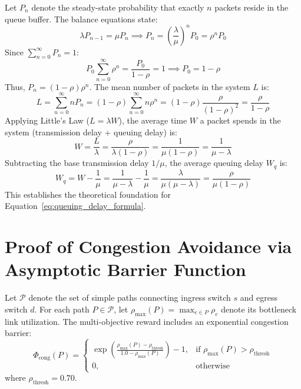 Let $P_n$ denote the steady-state probability that exactly $n$ packets reside in the queue buffer. The balance equations state:
\begin{equation}
    \lambda P_{n-1} = \mu P_n \implies P_n = \left(\frac{\lambda}{\mu}\right)^n P_0 = \rho^n P_0
\end{equation}
Since $\sum_{n=0}^\infty P_n = 1$:
\begin{equation}
    P_0 \sum_{n=0}^\infty \rho^n = \frac{P_0}{1 - \rho} = 1 \implies P_0 = 1 - \rho
\end{equation}
Thus, $P_n = (1 - \rho)\rho^n$. The mean number of packets in the system $L$ is:
\begin{equation}
    L = \sum_{n=0}^\infty n P_n = (1 - \rho) \sum_{n=0}^\infty n \rho^n = (1 - \rho) \frac{\rho}{(1 - \rho)^2} = \frac{\rho}{1 - \rho}
\end{equation}
Applying Little's Law ($L = \lambda W$), the average time $W$ a packet spends in the system (transmission delay + queuing delay) is:
\begin{equation}
    W = \frac{L}{\lambda} = \frac{\rho}{\lambda(1 - \rho)} = \frac{1}{\mu(1 - \rho)} = \frac{1}{\mu - \lambda}
\end{equation}
Subtracting the base transmission delay $1/\mu$, the average queuing delay $W_q$ is:
\begin{equation}
    W_q = W - \frac{1}{\mu} = \frac{1}{\mu - \lambda} - \frac{1}{\mu} = \frac{\lambda}{\mu(\mu - \lambda)} = \frac{\rho}{\mu(1 - \rho)}
\end{equation}
This establishes the theoretical foundation for Equation~\ref{eq:queuing_delay_formula}.

\section{Proof of Congestion Avoidance via Asymptotic Barrier Function}
\label{sec:proof_barrier}
Let $\mathcal{P}$ denote the set of simple paths connecting ingress switch $s$ and egress switch $d$. For each path $P \in \mathcal{P}$, let $\rho_{\max}(P) = \max_{e \in P} \rho_e$ denote its bottleneck link utilization. The multi-objective reward includes an exponential congestion barrier:
\begin{equation}
    \Phi_{\text{cong}}(P) = \begin{cases}
        \exp\left(\frac{\rho_{\max}(P) - \rho_{\text{thresh}}}{1.0 - \rho_{\max}(P)}\right) - 1, & \text{if } \rho_{\max}(P) > \rho_{\text{thresh}} \\
        0, & \text{otherwise}
    \end{cases}
\end{equation}
where $\rho_{\text{thresh}} = 0.70$.

